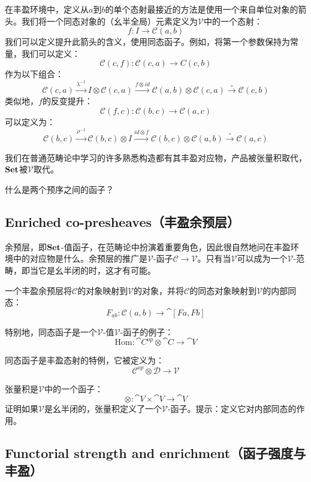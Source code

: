 \documentclass[DaoFP]{subfiles}
\begin{document}
 在丰盈环境中，定义从$a$到$b$的单个态射最接近的方法是使用一个来自单位对象的箭头。我们将一个同态对象的（幺半全局）元素定义为$\mathcal V$中的一个态射：
 \[ f \colon I \to \mathcal C(a, b) \]
 我们可以定义提升此箭头的含义，使用同态函子。例如，将第一个参数保持为常量，我们可以定义：
 \[ \mathcal C(c, f) \colon \mathcal C(c, a) \to C(c, b) \]
 作为以下组合：
 \[ \mathcal C(c, a) \xrightarrow{\lambda^{-1}} I \otimes \mathcal C(c, a) \xrightarrow{f \otimes id} \mathcal C(a, b) \otimes \mathcal C(c, a) \xrightarrow{\circ} \mathcal C(c, b) \]
 类似地，$f$的反变提升：
 \[ \mathcal C(f, c) \colon \mathcal C(b, c) \to \mathcal C(a, c) \]
 可以定义为：
 \[ \mathcal C(b, c) \xrightarrow{\rho^{-1}} \mathcal C(b, c) \otimes I \xrightarrow{id \otimes f} \mathcal C (b, c) \otimes \mathcal C(a, b) \xrightarrow{\circ} \mathcal C(a, c) \]

 我们在普通范畴论中学习的许多熟悉构造都有其丰盈对应物，产品被张量积取代，$\mathbf{Set}$被$\mathcal V$取代。

 \begin{exercise}
  什么是两个预序之间的函子？
 \end{exercise}

 \subsection{Enriched co-presheaves（丰盈余预层）}

 余预层，即$\mathbf{Set}$-值函子，在范畴论中扮演着重要角色，因此很自然地问在丰盈环境中的对应物是什么。余预层的推广是$\mathcal V$-函子$\mathcal C \to \mathcal V$。只有当$\mathcal V$可以成为一个$\mathcal V$-范畴，即当它是幺半闭的时，这才有可能。

 一个丰盈余预层将$\mathcal C$的对象映射到$\mathcal V$的对象，并将$\mathcal C$的同态对象映射到$\mathcal V$的内部同态：
 \[ F_{a b} \colon \mathcal C (a, b) \to \cat [F a, F b] \]

 特别地，同态函子是一个$\mathcal V$-值$\mathcal V$-函子的例子：
 \[ \text{Hom} \colon \cat C^{op} \otimes \cat C \to \cat V \]

 同态函子是丰盈态射的特例，它被定义为：
 \[ \mathcal C^{op} \otimes \mathcal D \to \mathcal V \]

 \begin{exercise}
  张量积是$\mathcal V$中的一个函子：
  \[ \otimes \colon \cat V \times \cat V \to \cat V \]
  证明如果$\mathcal V$是幺半闭的，张量积定义了一个$\mathcal V$-函子。提示：定义它对内部同态的作用。
 \end{exercise}

 \subsection{Functorial strength and enrichment（函子强度与丰盈）}
\end{document}
